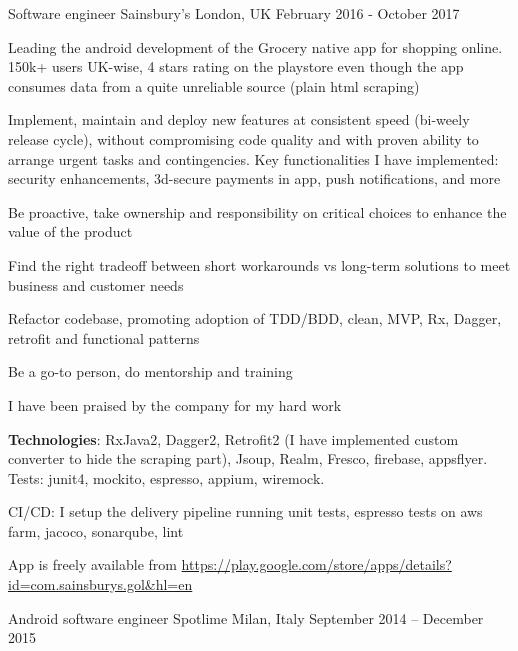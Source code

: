 \begin{cventries}
\cventry
	{Software engineer}
{Sainsbury's}
	{London, UK}
	{February 2016 - October 2017}
{%
\begin{cvitems} 
\item 
	Leading the android development of the Grocery 
   native app for shopping online. 
	150k+ users UK-wise, 4 stars rating on the playstore even though the app consumes data from a quite unreliable source (plain html scraping)
\item 
	Implement, maintain and deploy  
		new features at consistent speed (bi-weely release cycle), without compromising code quality and with proven ability to arrange urgent tasks and contingencies.
	 Key functionalities I have implemented: security enhancements, 3d-secure payments in app, push notifications, and more
	\item Be proactive, take ownership and responsibility on critical choices to enhance the value of the product
	\item Find the right tradeoff between 
		short workarounds vs long-term solutions to meet business and customer needs 
	\item Refactor codebase, promoting adoption of TDD/BDD, clean, MVP, Rx, Dagger, retrofit and functional patterns
    \item Be a go-to person, do mentorship and training
    \item 
    I have been praised by the company for my hard work
\item \textbf{Technologies}: 
    RxJava2, Dagger2, Retrofit2 (I have implemented custom converter to hide the scraping part), Jsoup,
    Realm,
   Fresco, firebase, appsflyer. Tests: junit4, mockito, espresso, appium, wiremock.
	\item  CI/CD: I setup the delivery pipeline running
		unit tests, espresso tests on aws farm, jacoco, sonarqube, lint
\item App is freely available from 
	\url{https://play.google.com/store/apps/details?id=com.sainsburys.gol&hl=en}
	\end{cvitems}
}
\cventry
{Android software engineer}
{Spotlime}
{Milan, Italy}
{September 2014 -- December 2015 }
{
	\begin{cvitems}

\end{cvitems}}
\end{cventries}
